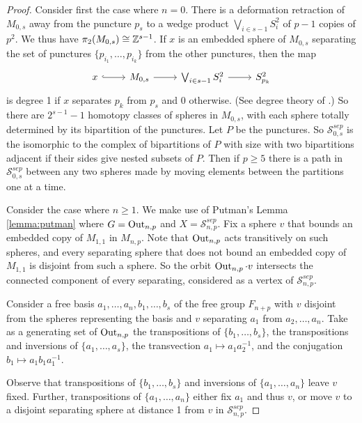 \begin{proof}
Consider first the case where $n=0$.
There is a deformation retraction of $M_{0,s}$ away from the puncture $p_s$ to a wedge product $\bigvee_{i \in s-1}S^2_i$ of $p-1$ copies of $p^2$.
We thus have $\pi_2(M_{0,s}) \cong \mathbb{Z}^{s-1}$.
If $x$ is an embedded sphere of $M_{0,s}$ separating the set of punctures $\{p_{i_1}, \ldots, p_{i_k}\}$ from the other punctures, then the map
$$
\begin{tikzcd}
x \arrow[hookrightarrow]{r}
& M_{0,s}  \arrow{r}
& \bigvee_{i \in s-1}S^2_i \arrow{r}
 &S^2_{p_k}
\end{tikzcd}
$$
is degree 1 if $x$ separates $p_k$ from $p_s$ and 0 otherwise.
(See degree theory of \cite{MR1867354}.)
So there are $2^{s-1}-1$ homotopy classes of spheres in $M_{0,s}$,
with each sphere totally determined by
its
bipartition of the punctures.
Let $P$ be the punctures.
So $\mathcal {S}^{sep}_{0,s}$ is the
isomorphic to the complex of
bipartitions of $P$ with size
with two bipartitions adjacent if their sides give nested subsets of $P$.
Then
if
$p \geq 5$ there is a path
in $\mathcal {S}^{sep}_{0,s}$ between any two spheres
made by moving elements between the partitions one at a time.


Consider the case where $n \geq 1$.
We make use of Putman's Lemma \ref{lemma:putman}
where $G = \operatorname{Out}_{n,p}$ and $X=\mathcal {S}^{sep}_{n,p}$.
Fix a sphere $v$ that bounds an embedded copy of $M_{1,1}$ in $M_{n,p}$.
Note that $\operatorname{Out}_{n,p}$ acts transitively on
such spheres, and every separating sphere that does not
bound an embedded copy of $M_{1,1}$
is disjoint from such a sphere.
So the orbit $\operatorname{Out}_{n,p} \cdot v$ intersects
the connected component of every separating, considered as a vertex of
$\mathcal {S}^{sep}_{n,p}$.

Consider a free basis $a_1, \ldots, a_n, b_1, \ldots, b_s$
of the free group $F_{n+p}$
with $v$ disjoint from the spheres representing the basis
and $v$ separating $a_1$ from $a_2, \ldots, a_n$.
Take as a generating set of $\operatorname{Out}_{n,p}$
the transpositions of $\{b_1, \ldots, b_s\}$,
the transpositions and inversions of $\{a_1, \ldots, a_s\}$,
the transvection $a_1 \mapsto a_1a_2^{-1}$,
and
the conjugation $b_1 \mapsto a_1b_1a_1^{-1}$.


Observe that transpositions of $\{b_1, \ldots, b_s\}$
and inversions of $\{a_1, \ldots, a_n\}$
leave $v$ fixed.
Further, transpositions of $\{a_1, \ldots, a_n\}$
either fix $a_1$ and thus $v$, or move $v$ to a disjoint separating sphere
at distance 1 from $v$ in $\mathcal {S}^{sep}_{n,p}$.


\end{proof}
